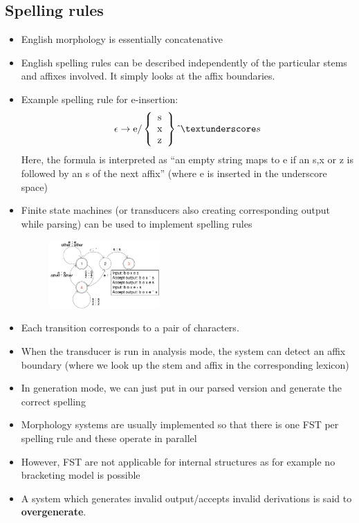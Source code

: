 \subsection{Spelling rules}
\begin{itemize}
	\item English morphology is essentially concatenative
	\item English spelling rules can be described independently of the particular stems and affixes involved. It simply looks at the affix boundaries.
	\item Example spelling rule for e-insertion:
	$$\epsilon \to \text{e}/\left\{\begin{array}{c}
	\text{s}\\
	\text{x}\\
	\text{z}
	\end{array}\right\}\hat{\text{ }}\textunderscore s$$
	Here, the formula is interpreted as ``an empty string maps to e if an s,x or z is followed by an s of the next affix'' (where e is inserted in the underscore space)
	\item Finite state machines (or transducers also creating corresponding output while parsing) can be used to implement spelling rules
	\begin{figure}[ht]
		\centering
		\includegraphics[width=0.4\textwidth]{figures/morphology_FST.png}
	\end{figure}
	\item Each transition corresponds to a pair of characters. 
	\item When the transducer is run in analysis mode, the system can detect an affix boundary (where we look up the stem and affix in the corresponding lexicon)
	\item In generation mode, we can just put in our parsed version and generate the correct spelling
	\item Morphology systems are usually implemented so that there is one FST per spelling rule and these operate in parallel
	\item However, FST are not applicable for internal structures as for example no bracketing model is possible
	\item A system which generates invalid output/accepts invalid derivations is said to \textbf{overgenerate}.
\end{itemize}